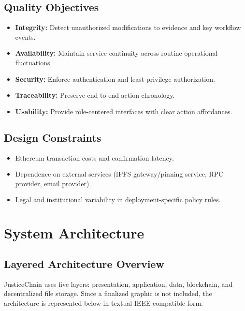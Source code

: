 \documentclass[conference]{IEEEtran}
\begin{document}
\subsection{Quality Objectives}
\begin{itemize}
    \item \textbf{Integrity:} Detect unauthorized modifications to evidence and key workflow events.
    \item \textbf{Availability:} Maintain service continuity across routine operational fluctuations.
    \item \textbf{Security:} Enforce authentication and least-privilege authorization.
    \item \textbf{Traceability:} Preserve end-to-end action chronology.
    \item \textbf{Usability:} Provide role-centered interfaces with clear action affordances.
\end{itemize}

\subsection{Design Constraints}
\begin{itemize}
    \item Ethereum transaction costs and confirmation latency.
    \item Dependence on external services (IPFS gateway/pinning service, RPC provider, email provider).
    \item Legal and institutional variability in deployment-specific policy rules.
\end{itemize}

\section{System Architecture}
\subsection{Layered Architecture Overview}
JusticeChain uses five layers: presentation, application, data, blockchain, and decentralized file storage. Since a finalized graphic is not included, the architecture is represented below in textual IEEE-compatible form.
\end{document}
